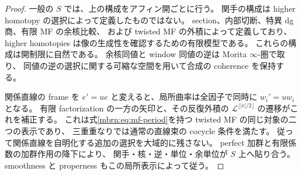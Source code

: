 \begin{proof}
一般の $S$ では、上の構成をアフィン開ごとに行う。
関手の構成は higher homotopy の選択によって定義したものではない。
section、内部切断、特異 dg 商、有限 MF の余核比較、
および twisted MF の外積によって定義しており、
higher homotopies は像の生成性を確認するための有限模型である。
これらの構成は開制限に自然である。
余核同値と window 同値の逆は Morita $\infty$-圏で取り、
同値の逆の選択に関する可縮な空間を用いて合成の coherence を保持する。

関係直線の frame を $e'=u e$ と変えると、局所曲率は全因子で同時に
$w_i'=u w_i$ となる。
有限 factorization の一方の矢印と、その反復外積の
$\mathscr L^{\lfloor|\epsilon|/2\rfloor}$ の遷移がこれを補正する。
これは式\eqref{mbrn:eq:mf-period}を持つ twisted MF の同じ対象の二つの表示であり、
三重重なりでは通常の直線束の cocycle 条件を満たす。
従って関係直線を自明化する追加の選択を大域的に残さない。
perfect 加群と有限係数の加群作用の降下により、
関手・核・逆・単位・余単位が $S$ 上へ貼り合う。
smoothness と properness もこの局所表示によって従う。
\end{proof}

